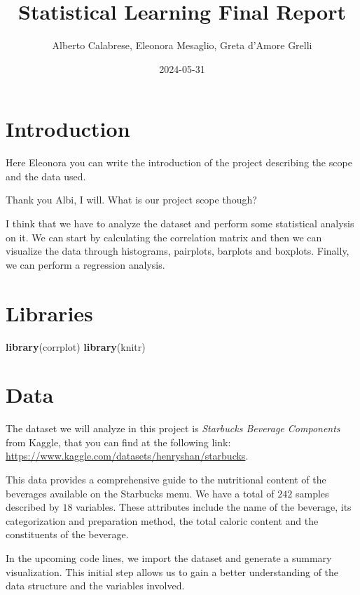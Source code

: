 \documentclass[
]{article}
\title{Statistical Learning Final Report}
\author{Alberto Calabrese, Eleonora Mesaglio, Greta d'Amore Grelli}
\date{2024-05-31}
\newenvironment{Shaded}{\begin{snugshade}}{\end{snugshade}}
\newcommand{\FunctionTok}[1]{\textcolor[rgb]{0.13,0.29,0.53}{\textbf{#1}}}
\newcommand{\NormalTok}[1]{#1}
\begin{document}
\maketitle

{
\setcounter{tocdepth}{3}
\tableofcontents
}
\section{Introduction}\label{introduction}

Here Eleonora you can write the introduction of the project describing
the scope and the data used.

Thank you Albi, I will. What is our project scope though?

I think that we have to analyze the dataset and perform some statistical
analysis on it. We can start by calculating the correlation matrix and
then we can visualize the data through histograms, pairplots, barplots
and boxplots. Finally, we can perform a regression analysis.

\section{Libraries}\label{libraries}

\begin{Shaded}
\begin{Highlighting}[]
\FunctionTok{library}\NormalTok{(corrplot)}
\FunctionTok{library}\NormalTok{(knitr)}
\end{Highlighting}
\end{Shaded}

\section{Data}\label{data}

The dataset we will analyze in this project is \emph{Starbucks Beverage
Components} from Kaggle, that you can find at the following link:
\url{https://www.kaggle.com/datasets/henryshan/starbucks}.

This data provides a comprehensive guide to the nutritional content of
the beverages available on the Starbucks menu. We have a total of
\(242\) samples described by \(18\) variables. These attributes include
the name of the beverage, its categorization and preparation method, the
total caloric content and the constituents of the beverage.

In the upcoming code lines, we import the dataset and generate a summary
visualization. This initial step allows us to gain a better
understanding of the data structure and the variables involved.
\end{document}
